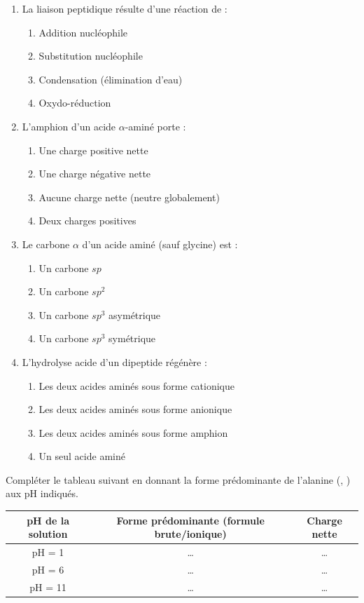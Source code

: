 \documentclass[11pt]{article}
\begin{document}
\begin{exercice}
\begin{enumerate}
    \item La liaison peptidique résulte d'une réaction de :
    \begin{enumerate}
        \item Addition nucléophile \item Substitution nucléophile \item Condensation (élimination d'eau) \item Oxydo-réduction
    \end{enumerate}
    \item L'amphion d'un acide $\alpha$-aminé porte :
    \begin{enumerate}
        \item Une charge positive nette \item Une charge négative nette \item Aucune charge nette (neutre globalement) \item Deux charges positives
    \end{enumerate}
    \item Le carbone $\alpha$ d'un acide aminé (sauf glycine) est :
    \begin{enumerate}
        \item Un carbone $sp$ \item Un carbone $sp^2$ \item Un carbone $sp^3$ asymétrique \item Un carbone $sp^3$ symétrique
    \end{enumerate}
    \item L'hydrolyse acide d'un dipeptide régénère :
    \begin{enumerate}
        \item Les deux acides aminés sous forme cationique \item Les deux acides aminés sous forme anionique \item Les deux acides aminés sous forme amphion \item Un seul acide aminé
    \end{enumerate}
\end{enumerate}
\end{exercice}

\begin{exercice}
Compléter le tableau suivant en donnant la forme prédominante de l'alanine (, ) aux pH indiqués.
\begin{center}
\begin{tabular}{|c|c|c|}
\hline
\textbf{pH de la solution} & \textbf{Forme prédominante (formule brute/ionique)} & \textbf{Charge nette} \\
\hline
pH = 1 & \ldots & \ldots \\
\hline
pH = 6 & \ldots & \ldots \\
\hline
pH = 11 & \ldots & \ldots \\
\hline
\end{tabular}
\end{center}
\end{exercice}
\end{document}
